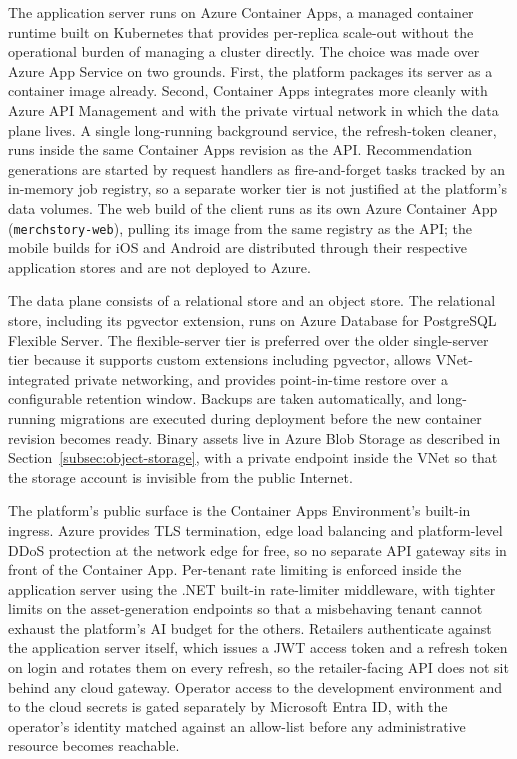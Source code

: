 The application server runs on Azure Container Apps, a managed container runtime built on Kubernetes that provides per-replica scale-out without the operational burden of managing a cluster directly. The choice was made over Azure App Service on two grounds. First, the platform packages its server as a container image already. Second, Container Apps integrates more cleanly with Azure API Management and with the private virtual network in which the data plane lives. A single long-running background service, the refresh-token cleaner, runs inside the same Container Apps revision as the API. Recommendation generations are started by request handlers as fire-and-forget tasks tracked by an in-memory job registry, so a separate worker tier is not justified at the platform's data volumes. The web build of the client runs as its own Azure Container App (\texttt{merchstory-web}), pulling its image from the same registry as the API; the mobile builds for iOS and Android are distributed through their respective application stores and are not deployed to Azure.

The data plane consists of a relational store and an object store. The relational store, including its pgvector extension, runs on Azure Database for PostgreSQL Flexible Server. The flexible-server tier is preferred over the older single-server tier because it supports custom extensions including pgvector, allows VNet-integrated private networking, and provides point-in-time restore over a configurable retention window. Backups are taken automatically, and long-running migrations are executed during deployment before the new container revision becomes ready. Binary assets live in Azure Blob Storage as described in Section~\ref{subsec:object-storage}, with a private endpoint inside the VNet so that the storage account is invisible from the public Internet.

The platform's public surface is the Container Apps Environment's built-in ingress. Azure provides TLS termination, edge load balancing and platform-level DDoS protection at the network edge for free, so no separate API gateway sits in front of the Container App. Per-tenant rate limiting is enforced inside the application server using the .NET built-in rate-limiter middleware, with tighter limits on the asset-generation endpoints so that a misbehaving tenant cannot exhaust the platform's AI budget for the others. Retailers authenticate against the application server itself, which issues a JWT access token and a refresh token on login and rotates them on every refresh, so the retailer-facing API does not sit behind any cloud gateway. Operator access to the development environment and to the cloud secrets is gated separately by Microsoft Entra ID, with the operator's identity matched against an allow-list before any administrative resource becomes reachable.

